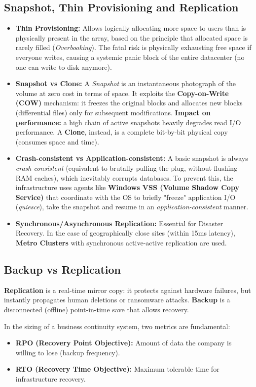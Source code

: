 \subsection{Snapshot, Thin Provisioning and Replication}
\begin{itemize}
    \item \textbf{Thin Provisioning:} Allows logically allocating more space to users than is physically present in the array, based on the principle that allocated space is rarely filled (\textit{Overbooking}). The fatal risk is physically exhausting free space if everyone writes, causing a systemic panic block of the entire datacenter (no one can write to disk anymore).
    \item \textbf{Snapshot vs Clone:} A \textit{Snapshot} is an instantaneous photograph of the volume at zero cost in terms of space. It exploits the \textbf{Copy-on-Write (COW)} mechanism: it freezes the original blocks and allocates new blocks (differential files) only for subsequent modifications. \textbf{Impact on performance:} a high chain of active snapshots heavily degrades read I/O performance. A \textbf{Clone}, instead, is a complete bit-by-bit physical copy (consumes space and time).
    \item \textbf{Crash-consistent vs Application-consistent:} A basic snapshot is always \textit{crash-consistent} (equivalent to brutally pulling the plug, without flushing RAM caches), which inevitably corrupts databases. To prevent this, the infrastructure uses agents like \textbf{Windows VSS (Volume Shadow Copy Service)} that coordinate with the OS to briefly "freeze" application I/O (\textit{quiesce}), take the snapshot and resume in an \textit{application-consistent} manner.
    \item \textbf{Synchronous/Asynchronous Replication:} Essential for Disaster Recovery. In the case of geographically close sites (within 15ms latency), \textbf{Metro Clusters} with synchronous active-active replication are used.
\end{itemize}

\subsection{Backup vs Replication}
\textbf{Replication} is a real-time mirror copy: it protects against hardware failures, but instantly propagates human deletions or ransomware attacks. \textbf{Backup} is a disconnected (offline) point-in-time save that allows recovery.

In the sizing of a business continuity system, two metrics are fundamental:
\begin{itemize}
    \item \textbf{RPO (Recovery Point Objective):} Amount of data the company is willing to lose (backup frequency).
    \item \textbf{RTO (Recovery Time Objective):} Maximum tolerable time for infrastructure recovery.
\end{itemize}

